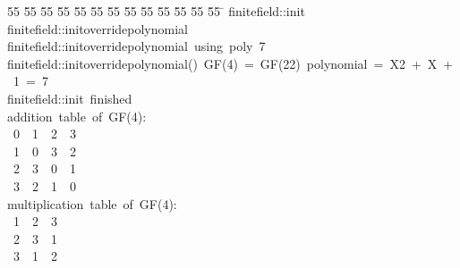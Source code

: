 %
%
\begin{tabbing}
55 \= 55 \= 55 \= 55 \= 55 \= 55 \= 55 \= 55 \= 55 \= 55 \= 55 \= 55 \= 55 \= \kill
finitefield::init\\[0pt]
finitefield::initoverridepolynomial\\[0pt]
finitefield::initoverridepolynomial\ using\ poly\ 7\\[0pt]
finitefield::initoverridepolynomial()\ GF(4)\ =\ GF(22)\ polynomial\ =\ X2\ +\ X\ +\ 1\ =\ 7\\[0pt]
finitefield::init\ finished\\[0pt]
addition\ table\ of\ GF(4):\\[0pt]
\ 0\ \ 1\ \ 2\ \ 3\ \\[0pt]
\ 1\ \ 0\ \ 3\ \ 2\ \\[0pt]
\ 2\ \ 3\ \ 0\ \ 1\ \\[0pt]
\ 3\ \ 2\ \ 1\ \ 0\ \\[0pt]
multiplication\ table\ of\ GF(4):\\[0pt]
\ 1\ \ 2\ \ 3\ \\[0pt]
\ 2\ \ 3\ \ 1\ \\[0pt]
\ 3\ \ 1\ \ 2\ \\[0pt]
\end{tabbing}
